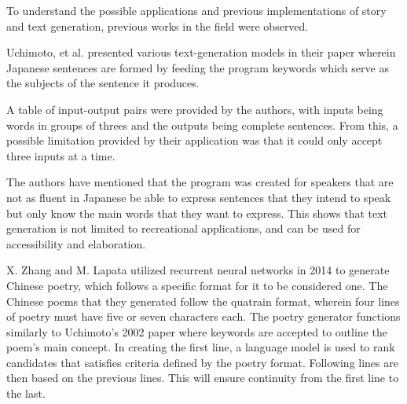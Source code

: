 \documentclass[journal]{./IEEE/IEEEtran}
\begin{document}



To understand the possible applications and previous implementations of story and text generation, previous works in the field were observed.

Uchimoto, et al. presented various text-generation models in their paper wherein Japanese sentences are formed by feeding the program keywords which serve as the subjects of the sentence it produces. \cite{UKIHSS2002} 

A table of input-output pairs were provided by the authors, with inputs being words in groups of threes and the outputs being complete sentences. From this, a possible limitation provided by their application was that it could only accept three inputs at a time.

\pubidadjcol
The authors have mentioned that the program was created for speakers that are not as fluent in Japanese be able to express sentences that they intend to speak but only know the main words that they want to express. This shows that text generation is not limited to recreational applications, and can be used for accessibility and elaboration. %

X. Zhang and M. Lapata utilized recurrent neural networks in 2014 to generate Chinese poetry, which follows a specific format for it to be considered one.
\cite{ZXLM2014}
The Chinese poems that they generated follow the quatrain format, wherein four lines of poetry must have five or seven characters each.
The poetry generator functions similarly to Uchimoto's 2002 paper where keywords are accepted to outline the poem's main concept.
In creating the first line, a language model is used to rank candidates that satisfies criteria defined by the poetry format. Following lines are then based on the previous lines. This will ensure continuity from the first line to the last.
\end{document}
